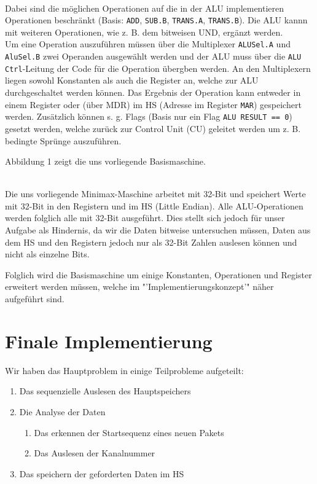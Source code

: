 \documentclass[12pt,titlepage]{article}
\begin{document}
\leavevmode \\

Dabei sind die m{\"o}glichen Operationen auf die in der ALU implementieren
Operationen beschr{\"a}nkt (Basis: \texttt{ADD}, \texttt{SUB.B}, \texttt{TRANS.A}, \texttt{TRANS.B}). Die ALU kannn mit weiteren Operationen,
wie z. B. dem bitweisen UND, erg{\"a}nzt werden.\\
Um eine Operation auszuf{\"u}hren m{\"u}ssen {\"u}ber die Multiplexer \texttt{ALUSel.A} und \texttt{AluSel.B} zwei Operanden ausgew{\"a}hlt werden
und der ALU muss {\"u}ber die \texttt{ALU Ctrl}-Leitung der Code f{\"u}r die Operation {\"u}bergben werden. An den Multiplexern liegen sowohl
Konstanten als auch die Register an, welche zur ALU durchgeschaltet werden k{\"o}nnen. Das Ergebnis der Operation kann
entweder in einem Register oder (über MDR) im HS (Adresse im Register \texttt{MAR}) gespeichert werden. Zus{\"a}tzlich k{\"o}nnen s. g. Flags (Basis nur ein Flag \texttt{ALU RESULT == 0})
gesetzt werden, welche zur{\"u}ck zur Control Unit (CU) geleitet werden um z. B. bedingte Spr{\"u}nge auszuf{\"u}hren.

Abbildung 1 zeigt die uns vorliegende Basismaschine.

\leavevmode \\

Die uns vorliegende Minimax-Maschine arbeitet mit 32-Bit und speichert Werte mit 32-Bit in den Registern und im HS (\dq Little Endian\dq ).
Alle ALU-Operationen werden folglich alle mit 32-Bit ausgef{\"u}hrt. Dies stellt sich jedoch f{\"u}r unser Aufgabe als
Hindernis, da wir die Daten bitweise untersuchen m{\"u}ssen, Daten aus dem HS und den Registern jedoch nur als
32-Bit Zahlen auslesen k{\"o}nnen und nicht als einzelne Bits.

Folglich wird die Basismaschine um einige Konstanten, Operationen und Register erweitert werden müssen, welche im "'Implementierungskonzept'" n{\"a}her
aufgeführt sind.

\newpage

\section{Finale Implementierung}
Wir haben das Hauptproblem in einige Teilprobleme aufgeteilt:
\begin{enumerate}
\item Das sequenzielle Auslesen des Hauptspeichers
\item Die Analyse der Daten
    \begin{enumerate}
    \item Das erkennen der Startsequenz eines neuen Pakets
    \item Das Auslesen der Kanalnummer
    \end{enumerate}
\item Das speichern der geforderten Daten im HS
\end{enumerate}
\end{document}
